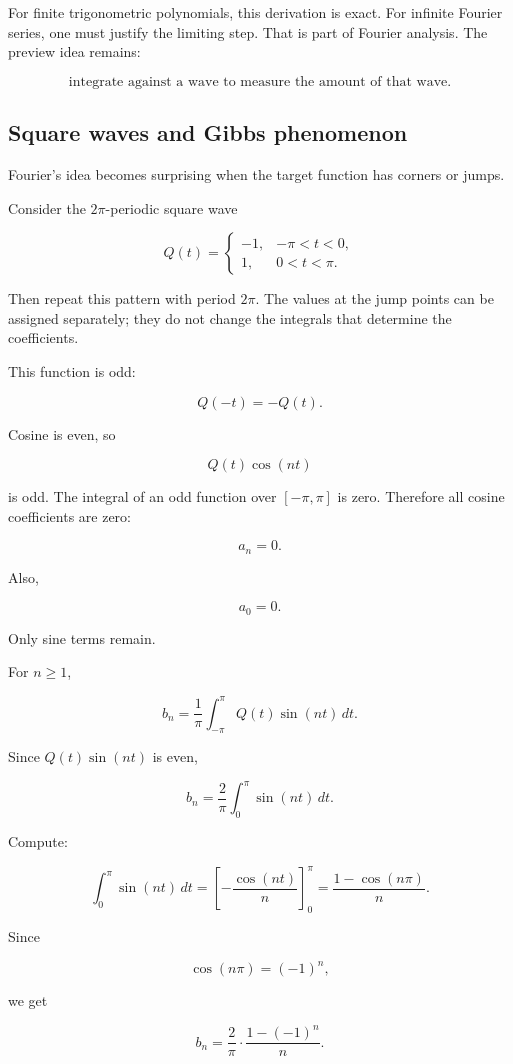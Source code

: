 For finite trigonometric polynomials, this derivation is exact.  For infinite Fourier
series, one must justify the limiting step.  That is part of Fourier analysis.  The preview
idea remains:

\[
\boxed{
\text{integrate against a wave to measure the amount of that wave.}
}
\]

\subsection{Square waves and Gibbs phenomenon}
\label{subsec:square-waves-gibbs-phenomenon}

Fourier's idea becomes surprising when the target function has corners or jumps.

Consider the \(2\pi\)-periodic square wave

\[
Q(t)=
\begin{cases}
-1, & -\pi<t<0,\\
1, & 0<t<\pi.
\end{cases}
\]

Then repeat this pattern with period \(2\pi\).  The values at the jump points can be
assigned separately; they do not change the integrals that determine the coefficients.

This function is odd:

\[
Q(-t)=-Q(t).
\]

Cosine is even, so

\[
Q(t)\cos(nt)
\]

is odd.  The integral of an odd function over \([-\pi,\pi]\) is zero.  Therefore all cosine
coefficients are zero:

\[
a_n=0.
\]

Also,

\[
a_0=0.
\]

Only sine terms remain.

For \(n\ge1\),

\[
b_n=
\frac1\pi
\int_{-\pi}^{\pi} Q(t)\sin(nt)\,dt.
\]

Since \(Q(t)\sin(nt)\) is even,

\[
b_n=
\frac2\pi
\int_0^\pi \sin(nt)\,dt.
\]

Compute:

\[
\int_0^\pi \sin(nt)\,dt
=
\left[-\frac{\cos(nt)}{n}\right]_0^\pi
=
\frac{1-\cos(n\pi)}{n}.
\]

Since

\[
\cos(n\pi)=(-1)^n,
\]

we get

\[
b_n=
\frac2\pi
\cdot
\frac{1-(-1)^n}{n}.
\]

